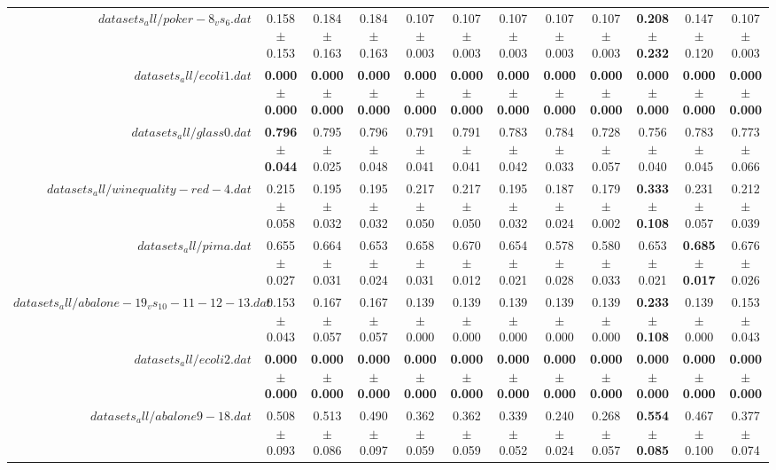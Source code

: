 \begin{table}[!ht]
{\begin{tabular}{r c c c c c c c c c c c}
$datasets_all/poker-8_vs_6.dat$ & 0.158 $\pm$ 0.153 & 0.184 $\pm$ 0.163 & 0.184 $\pm$ 0.163 & 0.107 $\pm$ 0.003 & 0.107 $\pm$ 0.003 & 0.107 $\pm$ 0.003 & 0.107 $\pm$ 0.003 & 0.107 $\pm$ 0.003 & \textbf{0.208 $\pm$ 0.232} & 0.147 $\pm$ 0.120 & 0.107 $\pm$ 0.003 \\
$datasets_all/ecoli1.dat$ & \textbf{0.000 $\pm$ 0.000} & \textbf{0.000 $\pm$ 0.000} & \textbf{0.000 $\pm$ 0.000} & \textbf{0.000 $\pm$ 0.000} & \textbf{0.000 $\pm$ 0.000} & \textbf{0.000 $\pm$ 0.000} & \textbf{0.000 $\pm$ 0.000} & \textbf{0.000 $\pm$ 0.000} & \textbf{0.000 $\pm$ 0.000} & \textbf{0.000 $\pm$ 0.000} & \textbf{0.000 $\pm$ 0.000} \\
$datasets_all/glass0.dat$ & \textbf{0.796 $\pm$ 0.044} & 0.795 $\pm$ 0.025 & 0.796 $\pm$ 0.048 & 0.791 $\pm$ 0.041 & 0.791 $\pm$ 0.041 & 0.783 $\pm$ 0.042 & 0.784 $\pm$ 0.033 & 0.728 $\pm$ 0.057 & 0.756 $\pm$ 0.040 & 0.783 $\pm$ 0.045 & 0.773 $\pm$ 0.066 \\
$datasets_all/winequality-red-4.dat$ & 0.215 $\pm$ 0.058 & 0.195 $\pm$ 0.032 & 0.195 $\pm$ 0.032 & 0.217 $\pm$ 0.050 & 0.217 $\pm$ 0.050 & 0.195 $\pm$ 0.032 & 0.187 $\pm$ 0.024 & 0.179 $\pm$ 0.002 & \textbf{0.333 $\pm$ 0.108} & 0.231 $\pm$ 0.057 & 0.212 $\pm$ 0.039 \\
$datasets_all/pima.dat$ & 0.655 $\pm$ 0.027 & 0.664 $\pm$ 0.031 & 0.653 $\pm$ 0.024 & 0.658 $\pm$ 0.031 & 0.670 $\pm$ 0.012 & 0.654 $\pm$ 0.021 & 0.578 $\pm$ 0.028 & 0.580 $\pm$ 0.033 & 0.653 $\pm$ 0.021 & \textbf{0.685 $\pm$ 0.017} & 0.676 $\pm$ 0.026 \\
$datasets_all/abalone-19_vs_10-11-12-13.dat$ & 0.153 $\pm$ 0.043 & 0.167 $\pm$ 0.057 & 0.167 $\pm$ 0.057 & 0.139 $\pm$ 0.000 & 0.139 $\pm$ 0.000 & 0.139 $\pm$ 0.000 & 0.139 $\pm$ 0.000 & 0.139 $\pm$ 0.000 & \textbf{0.233 $\pm$ 0.108} & 0.139 $\pm$ 0.000 & 0.153 $\pm$ 0.043 \\
$datasets_all/ecoli2.dat$ & \textbf{0.000 $\pm$ 0.000} & \textbf{0.000 $\pm$ 0.000} & \textbf{0.000 $\pm$ 0.000} & \textbf{0.000 $\pm$ 0.000} & \textbf{0.000 $\pm$ 0.000} & \textbf{0.000 $\pm$ 0.000} & \textbf{0.000 $\pm$ 0.000} & \textbf{0.000 $\pm$ 0.000} & \textbf{0.000 $\pm$ 0.000} & \textbf{0.000 $\pm$ 0.000} & \textbf{0.000 $\pm$ 0.000} \\
$datasets_all/abalone9-18.dat$ & 0.508 $\pm$ 0.093 & 0.513 $\pm$ 0.086 & 0.490 $\pm$ 0.097 & 0.362 $\pm$ 0.059 & 0.362 $\pm$ 0.059 & 0.339 $\pm$ 0.052 & 0.240 $\pm$ 0.024 & 0.268 $\pm$ 0.057 & \textbf{0.554 $\pm$ 0.085} & 0.467 $\pm$ 0.100 & 0.377 $\pm$ 0.074 \\

\end{tabular}}
\end{table}
